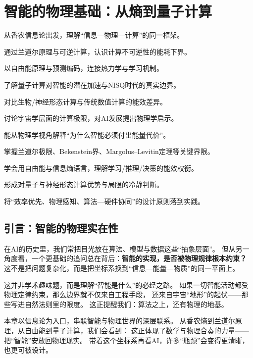 \chapter{智能的物理基础：从熵到量子计算}

\begin{introduction}[本章提要]
  \item 从香农信息论出发，理解“信息—物理—计算”的同一框架。
  \item 通过兰道尔原理与可逆计算，认识计算不可逆性的能耗下界。
  \item 以自由能原理与预测编码，连接热力学与学习机制。
  \item 了解量子计算对智能的潜在加速与NISQ时代的真实边界。
  \item 对比生物/神经形态计算与传统数值计算的能效差异。
  \item 讨论宇宙学层面的计算极限，对AI发展提出物理学启示。
\end{introduction}

\begin{introduction}[你将收获]
  \item 能从物理学视角解释“为什么智能必须付出能量代价”。
  \item 掌握兰道尔极限、Bekenstein界、Margolus--Levitin定理等关键界限。
  \item 学会用自由能与信息熵语言，理解学习/推理/决策的能效权衡。
  \item 形成对量子与神经形态计算优势与局限的冷静判断。
  \item 将“效率优先、物理感知、算法—硬件协同”的设计原则落到实践。
\end{introduction}

\section{引言：智能的物理实在性}

在AI的历史里，我们常把目光放在算法、模型与数据这些“抽象层面”。  
但从另一角度看，一个更基础的追问总在背后：\textbf{智能的实现，是否被物理规律根本约束？}  
这不是把问题复杂化，而是把坐标系换到“信息—能量—物质”的同一平面上。

这并非学术趣味题，而是理解“智能是什么”的必经之路。  
如果一切智能活动都受物理定律约束，那么边界就不仅来自工程手段，  
还来自宇宙“地形”的起伏——那些写进自然法则里的限度。  
这正提醒我们：算法之上，还有物理的地基。

本章以信息论为入口，串联智能与物理世界的深层联系。  
从香农熵到兰道尔原理，从自由能到量子计算，我们会看到：  
这正体现了数学与物理合奏的力量——把“智能”安放回物理现实。  
带着这个坐标系再看AI，许多“瓶颈”会变得更清晰，也更可被设计。


